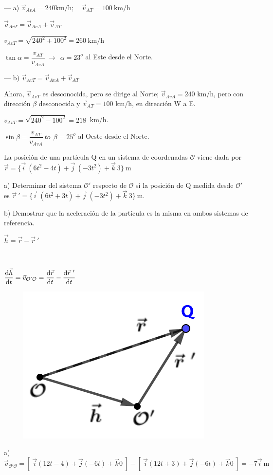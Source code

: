 --- a) $\vec v_{AvA}=240 \text{km/h};\quad \vec v_{AT}=100\ \text{km/h}$

$\vec v_{AvT}=\vec v_{AvA}+\vec v_{AT}$

$v_{AvT}=\sqrt{240^2+100^2}=260\ \text{km/h}$

$\tan \alpha=\dfrac {v_{AT}}{v_{AvA}}\ \to \ \  \alpha = 23^o $ al Este desde el Norte.

--- b) $\vec v_{AvT}=\vec v_{AvA}+\vec v_{AT}$

Ahora, $\vec v_{AvT}$ es desconocida, pero se dirige al Norte; $\vec v_{AvA}=240$ km/h, pero con dirección $\beta$ desconocida  y $\vec v_{AT}=100$ km/h, en dirección W a E.

$v_{AvT}= \sqrt{240^2-100^2}=218\ $ km/h.

$\sin \beta=\dfrac{v_{AT}}{v_{AvA}}\ to \ \ \beta=25^o$ al Oeste desde el Norte.



\begin{prob}
La posición de una partícula Q en un sistema de coordenadas $\mathcal O$	viene dada por $\vec r=\{ \vec i\ (6t^2-4t)+\vec j\ (-3t^2)+\vec k\ 3\}\ \mathrm{m}$

a) Determinar del sistema $\mathcal O'$ respecto de $\mathcal O$ si la posición de Q medida desde $\mathcal O'$ es $\vec r\ '=\{ \vec i\ (6t^2+3t)+\vec j\ (-3t^2)+\vec k\ 3\}\ \mathrm{m}$.

b) Demostrar que la aceleración de la partícula es la misma en ambos sistemas de referencia.
\end{prob}

\begin{multicols}{2}
	$\vec h=\vec r-\vec r\ '$
	
	$\quad$
	
	$\displaystyle \dv{\vec h}{t} = \vec v_{\mathcal O' \mathcal O}=\dv{\vec r}{t}-\dv{\vec r\ '}{t}$
	\begin{figure}[H]
	\centering
	\includegraphics[width=.3\textwidth]{imagenes/imagenes10/T10IM08.png}
\end{figure}
\end{multicols}
a) $\vec v_{\mathcal O' \mathcal O}=[\ \vec i (12t-4)+\vec j (-6t)+\vec k 0 \ ]-[\ \vec i(12t+3)+\vec j(-6t)+\vec k 0  \ ]=-7\vec i\ \text{m}$

